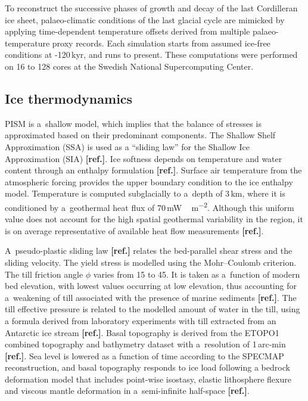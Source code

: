 \documentclass[tc, manuscript]{copernicus}
\newcommand{\aref}[0]{\textbf{[ref.]}}
\renewcommand{\citep}[1]{\aref}
\begin{document}
To reconstruct the successive phases of growth and decay of the last Cordilleran
ice sheet, palaeo-climatic conditions of the last glacial cycle are mimicked
by applying time-dependent temperature offsets derived from multiple
palaeo-temperature proxy records. Each simulation starts from assumed ice-free
conditions at -120\,kyr, and runs to present. These computations were
performed on 16 to 128 cores at the Swedish National Supercomputing
Center.

\subsection{Ice thermodynamics}

PISM is a~shallow model, which implies that the balance of stresses is
approximated based on their predominant components.
The Shallow Shelf Approximation (SSA) is used as a ``sliding law'' for the
Shallow Ice Approximation (SIA) \citep{bueler-brown-2009,winkelmann-etal-2011}.
Ice softness depends on temperature and water content through an enthalpy
formulation \citep{aschwanden-blatter-2009,aschwanden-etal-2012}. Surface air
temperature from the atmospheric forcing provides the upper boundary condition
to the ice enthalpy model. Temperature is computed subglacially to a~depth of
3\,km, where it is conditioned by a~geothermal heat flux of
70\,\unit{mW\,m^{-2}}. Although this uniform value does not
account for the high spatial geothermal variability in the region, it is on
average representative of available heat flow measurements
\citep{artemieva-mooney-2001,blackwell-richards-2004}.

A~pseudo-plastic sliding law \citep{aschwanden-etal-2013} relates the
bed-parallel shear stress and the sliding velocity. The yield stress is
modelled using the Mohr--Coulomb criterion. The till friction angle $\phi$
varies from 15 to 45{\degree}. It is taken as a~function of modern bed
elevation, with lowest values occurring at low elevation, thus accounting
for a~weakening of till associated with the presence of marine sediments
\citep{martin-etal-2011,aschwanden-etal-2013}. The till effective pressure is
related to the modelled amount of water in the till, using a formula derived
from laboratory experiments with till extracted from an Antarctic ice stream
\aref. Basal topography is derived from the ETOPO1 combined topography
and bathymetry dataset with a~resolution of 1\,arc-min \citep{data:etopo1}.
Sea level is lowered as a function of time according to the SPECMAP
reconstruction, and basal topography responds to ice load
following a bedrock deformation model that includes point-wise isostasy,
elastic lithosphere flexure and viscous mantle deformation in a~semi-infinite
half-space \citep{lingle-clark-1985,bueler-etal-2007}.
\end{document}
